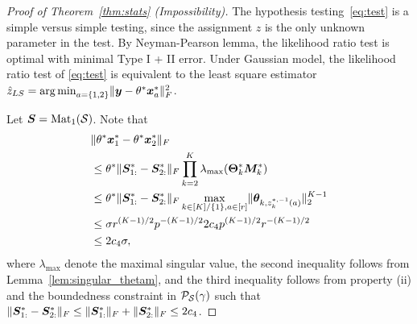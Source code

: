 \documentclass[journal]{IEEEtran}
\theoremstyle{definition}
\theoremstyle{definition}
\begin{document}
\begin{proof}[Proof of Theorem~\ref{thm:stats} (Impossibility)]
   The hypothesis testing~\eqref{eq:test} is a simple versus simple testing, since the assignment $z$ is the only unknown parameter in the test. 
   By Neyman-Pearson lemma, the likelihood ratio test is optimal with minimal Type I + II error. Under Gaussian model, the likelihood ratio test of \eqref{eq:test} is equivalent to the least square estimator $\hat z_{LS} = \operatorname*{arg\,min}_{a = \{1,2\}} \lVert\bm{y} - \theta^* \bm x_a^*\rVert_F^2$. 
   
   Let $\bm S = \text{Mat}_1(\mathcal{S})$. Note that 
   \begin{align}
       &\onormSize{}{ \theta^* \mx_1^*  - \theta^* \mx_2^*}_F\\
       &\leq  \theta^* \onormSize{}{ \mS^*_{1:} - \mS^*_{2:} }_F \prod_{k = 2}^K \lambda_{\max}(\mTheta_k^*\mM_k^*)  \\
       & \leq \theta^* \onormSize{}{ \mS^*_{1:} - \mS^*_{2:} }_F   \max_{k \in [K]/\{1\}, a \in [r]} \onormSize{}{\mtheta_{k, z^{*, -1}_k(a)}}_2^{K-1} \\
       & \leq  \sigma r^{(K-1)/2} p^{-(K-1)/2} 2 c_4 p^{(K-1)/2} r^{-(K-1)/2}\\
       & \leq 2 c_4 \sigma, \label{eq:bound}
   \end{align}
   where $\lambda_{\max}$ denote the maximal singular value, the second inequality follows from Lemma~\ref{lem:singular_thetam}, and the third inequality follows from property (ii) and the boundedness constraint in $\mathcal{P}_{\mathcal{S}}(\gamma)$ such that $\lVert \bm S^*_{1:} - \bm S^*_{2:} \rVert_F  \leq \lVert\bm S_{1:}^*\rVert_F + \lVert\bm S_{2:}^*\rVert_F \leq 2c_4$.


\end{proof}
\end{document}
